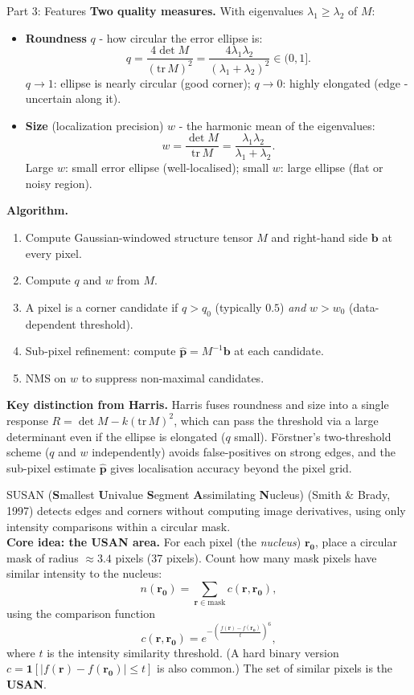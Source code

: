 \documentclass[letterpaper]{article}
\begin{document}
\begin{notes}{Part 3: Features}
\textbf{Two quality measures.} With eigenvalues $\lambda_1 \ge \lambda_2$ of $M$:
\begin{itemize}
    \item \textbf{Roundness} $q$ - how circular the error ellipse is:
    $$q = \frac{4\det M}{(\mathrm{tr}\,M)^2} = \frac{4\lambda_1\lambda_2}{(\lambda_1+\lambda_2)^2} \in (0,1].$$
    $q \to 1$: ellipse is nearly circular (good corner); $q \to 0$: highly elongated (edge - uncertain along it).
    \item \textbf{Size} (localization precision) $w$ - the harmonic mean of the eigenvalues:
    $$w = \frac{\det M}{\mathrm{tr}\,M} = \frac{\lambda_1\lambda_2}{\lambda_1+\lambda_2}.$$
    Large $w$: small error ellipse (well-localised); small $w$: large ellipse (flat or noisy region).
\end{itemize}

\textbf{Algorithm.}
\begin{enumerate}
    \item Compute Gaussian-windowed structure tensor $M$ and right-hand side $\mathbf{b}$ at every pixel.
    \item Compute $q$ and $w$ from $M$.
    \item A pixel is a corner candidate if $q > q_0$ (typically $0.5$) \emph{and} $w > w_0$ (data-dependent threshold).
    \item Sub-pixel refinement: compute $\hat{\mathbf{p}} = M^{-1}\mathbf{b}$ at each candidate.
    \item NMS on $w$ to suppress non-maximal candidates.
\end{enumerate}

\textbf{Key distinction from Harris.} Harris fuses roundness and size into a single response $R = \det M - k(\mathrm{tr}\,M)^2$, which can pass the threshold via a large determinant even if the ellipse is elongated ($q$ small). Förstner's two-threshold scheme ($q$ and $w$ independently) avoids false-positives on strong edges, and the sub-pixel estimate $\hat{\mathbf{p}}$ gives localisation accuracy beyond the pixel grid.


SUSAN (\textbf{S}mallest \textbf{U}nivalue \textbf{S}egment \textbf{A}ssimilating \textbf{N}ucleus) (Smith \& Brady, 1997) detects edges and corners without computing image derivatives, using only intensity comparisons within a circular mask.\\

\textbf{Core idea: the USAN area.} For each pixel (the \emph{nucleus}) $\mathbf{r_0}$, place a circular mask of radius $\approx 3.4$ pixels (37 pixels). Count how many mask pixels have similar intensity to the nucleus:
$$n(\mathbf{r_0}) = \sum_{\mathbf{r}\in\text{mask}} c(\mathbf{r},\mathbf{r_0}),$$
using the comparison function
$$c(\mathbf{r},\mathbf{r_0}) = e^{-\left(\frac{f(\mathbf{r})-f(\mathbf{r_0})}{t}\right)^{\!6}},$$
where $t$ is the intensity similarity threshold. (A hard binary version $c=\mathbf{1}[|f(\mathbf{r})-f(\mathbf{r_0})|\le t]$ is also common.) The set of similar pixels is the \textbf{USAN}.\\


\end{notes}
\end{document}
